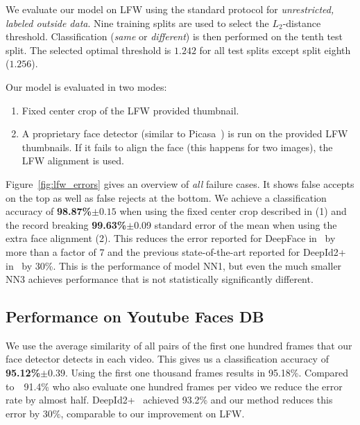 \documentclass[10pt,twocolumn,letterpaper]{article}
\begin{document}
We evaluate our model on LFW using the standard protocol for
\emph{unrestricted, labeled outside data}. Nine training splits are used to
select the $L_2$-distance threshold. Classification
(\emph{same} or \emph{different}) is then performed on the tenth test split.
The selected optimal threshold is $1.242$ for all test splits except split
eighth ($1.256$).

Our model is evaluated in two modes:
\begin{enumerate}
    \item Fixed center crop of the LFW provided thumbnail.\vspace{-.5em}
    \item A proprietary face detector (similar to
      Picasa~\cite{joint_cascade_face_detection}) is run on the provided LFW
      thumbnails. If it fails to align the face (this happens for two images),
      the LFW alignment is used.
\end{enumerate}

Figure~\ref{fig:lfw_errors} gives an overview of \emph{all} failure cases. It
shows false accepts on the top as well as false rejects at the bottom.  We
achieve a classification accuracy of \textbf{98.87\%}$\pm0.15$ when using the
fixed center crop described in (1) and the record breaking
\textbf{99.63\%}$\pm$0.09 standard error of the mean when using the extra face
alignment (2). This reduces the error reported for DeepFace in~\cite{deepface}
by more than a factor of 7 and the previous state-of-the-art reported for
DeepId2+ in~\cite{deepid2plus} by 30\%. This is the performance of model NN1,
but even the much smaller NN3 achieves performance that is not statistically
significantly different.

\subsection{Performance on Youtube Faces DB}
\label{ytf_experiments}
We use the average similarity of all pairs of the first one hundred frames
that our face detector detects in each video. This gives us a classification
accuracy of \textbf{95.12\%}$\pm0.39$.  Using the first one thousand frames
  results in 95.18\%.
  Compared to~\cite{deepface}~91.4\% who also evaluate one hundred frames per
  video we reduce the error rate by almost half. DeepId2+~\cite{deepid2plus}
  achieved 93.2\% and our method reduces this error by 30\%, comparable to our
  improvement on LFW.
\end{document}
